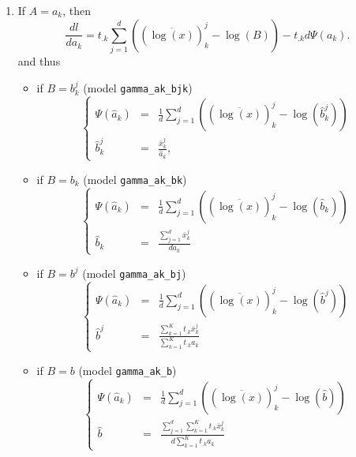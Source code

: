 \documentclass[a4paper,10pt]{article}
\begin{document}
\begin{enumerate}
\item If $A = a_{k}$, then
$$
\frac{dl}{da_k} = t_{.k} \sum_{j=1}^d \left( (\overline{\log(x)})^j_k - \log(B)\right) - t_{.k}d\Psi(a_k).
$$
and thus
\begin{itemize}
\item if $B=b^j_k$ (model \verb+gamma_ak_bjk+)
\begin{equation}\label{eq:mStep_ak_bjk}
\left\lbrace
\begin{array}{lcl}
\Psi(\hat{a}_k) & = & \frac{1}{d} \sum_{j=1}^d \left( (\overline{\log(x)})^j_k - \log(\hat{b}^j_k) \right) \\
    \hat{b}^j_k & = & \frac{\bar{x}^j_k}{\hat{a}_k},
\end{array}
\right.
\end{equation}
\item  if $B=b_k$  (model \verb+gamma_ak_bk+)
\begin{equation}\label{eq:mStep_ak_bk}
\left\lbrace
\begin{array}{lcl}
\Psi(\hat{a}_k) & = & \frac{1}{d} \sum_{j=1}^d \left( (\overline{\log(x)})^j_k - \log(\hat{b}_k) \right) \\
  \hat{b}_k     & = & \frac{\sum_{j=1}^d  \bar{x}^j_k}{d a_k}
\end{array}
\right.
\end{equation}
\item  if $B=b^j$  (model \verb+gamma_ak_bj+)
\begin{equation}\label{eq:mStep_ak_bj}
\left\lbrace
\begin{array}{lcl}
\Psi(\hat{a}_k) & = & \frac{1}{d} \sum_{j=1}^d \left( (\overline{\log(x)})^j_k - \log(\hat{b}^j) \right) \\
  \hat{b}^j     & = & \frac{\sum_{k=1}^K t_{.k} \bar{x}^j_k}{\sum_{k=1}^K t_{.k} a_k}
\end{array}
\right.
\end{equation}
\item if $B=b$  (model \verb+gamma_ak_b+)
\begin{equation}\label{eq:mStep_ak_b}
\left\lbrace
\begin{array}{lcl}
\Psi(\hat{a}_k) & = & \frac{1}{d} \sum_{j=1}^d \left( (\overline{\log(x)})^j_k - \log(\hat{b}) \right) \\
  \hat{b}       & = & \frac{\sum_{j=1}^d\sum_{k=1}^K t_{.k} \bar{x}^j_k}{d\sum_{k=1}^K t_{.k} a_k}
\end{array}
\right.
\end{equation}
\end{itemize}


\end{enumerate}
\end{document}
